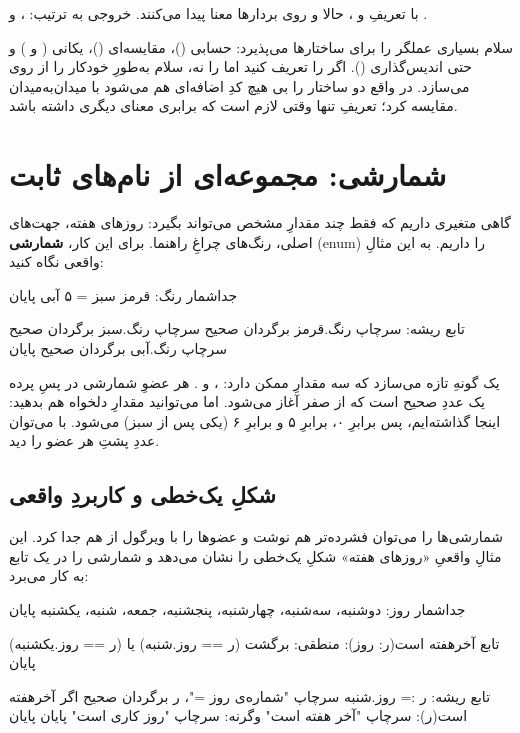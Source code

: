 با تعریفِ  و ، حالا  و
 روی بردارها معنا پیدا می‌کنند. خروجی به ترتیب: ،
 و .

\begin{note}
سلام بسیاری عملگر را برای ساختارها می‌پذیرد: حسابی (\code{+ - * / \% **})،
مقایسه‌ای (\code{== != < > <= >=})، یکانی (\code{-} و ) و حتی اندیس‌گذاری
(\code{[]}). اگر \code{==} را تعریف کنید اما \code{!=} را نه، سلام به‌طورِ
خودکار \code{!=} را از روی \code{==} می‌سازد. در واقع دو ساختار را بی هیچ کدِ
اضافه‌ای هم می‌شود با \code{==} میدان‌به‌میدان مقایسه کرد؛ تعریفِ \code{==}
تنها وقتی لازم است که برابری معنای دیگری داشته باشد.
\end{note}

\section{شمارشی: مجموعه‌ای از نام‌های ثابت}

گاهی متغیری داریم که فقط چند مقدارِ مشخص می‌تواند بگیرد: روزهای هفته، جهت‌های
اصلی، رنگ‌های چراغِ راهنما. برای این کار، \textbf{شمارشی} (enum) را داریم. به
این مثالِ واقعی نگاه کنید:

\begin{salamfa}
جداشمار رنگ:
    قرمز
    سبز = ۵
    آبی
پایان

تابع ریشه:
    سرچاپ رنگ.قرمز برگردان صحیح
    سرچاپ رنگ.سبز برگردان صحیح
    سرچاپ رنگ.آبی برگردان صحیح
پایان
\end{salamfa}

 یک گونهِ تازه می‌سازد که سه مقدارِ ممکن دارد: ،
 و . هر عضوِ شمارشی در پسِ پرده یک عددِ صحیح است که از صفر
آغاز می‌شود. اما می‌توانید مقدارِ دلخواه هم بدهید: اینجا  گذاشته‌ایم،
پس  برابرِ ۰،  برابرِ ۵ و  برابرِ ۶ (یکی پس از
سبز) می‌شود. با  می‌توان عددِ پشتِ هر عضو را دید.

\subsection{شکلِ یک‌خطی و کاربردِ واقعی}

شمارشی‌ها را می‌توان فشرده‌تر هم نوشت و عضوها را با ویرگول از هم جدا کرد. این
مثالِ واقعیِ «روزهای هفته» شکلِ یک‌خطی را نشان می‌دهد و شمارشی را در یک تابع به
کار می‌برد:

\begin{salamfa}
جداشمار روز: دوشنبه، سه‌شنبه، چهارشنبه، پنجشنبه، جمعه، شنبه، یکشنبه پایان

تابع آخرهفته است(ر: روز): منطقی: برگشت (ر == روز.شنبه) یا (ر == روز.یکشنبه) پایان

تابع ریشه:
    ر := روز.شنبه
    سرچاپ "شماره‌ی روز ="، ر برگردان صحیح
    اگر آخرهفته است(ر): سرچاپ "آخر هفته است"
    وگرنه:               سرچاپ "روز کاری است"
    پایان
پایان
\end{salamfa}

